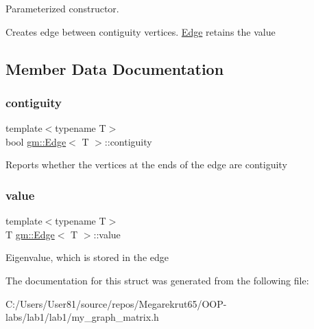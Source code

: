 Parameterized constructor. 

Creates edge between contiguity vertices. \mbox{\hyperlink{structgm_1_1_edge}{Edge}} retains the value 

\subsection{Member Data Documentation}
\mbox{\label{structgm_1_1_edge_ad9bbe3016236ffff899a0b982e96a6cd}} 
\subsubsection{\texorpdfstring{contiguity}{contiguity}}
{\footnotesize\ttfamily template$<$typename T$>$ \\
bool \mbox{\hyperlink{structgm_1_1_edge}{gm\+::\+Edge}}$<$ T $>$\+::contiguity}

Reports whether the vertices at the ends of the edge are contiguity \mbox{\label{structgm_1_1_edge_a45d07f827a6133ea2179fdbebe0867f1}} 
\subsubsection{\texorpdfstring{value}{value}}
{\footnotesize\ttfamily template$<$typename T$>$ \\
T \mbox{\hyperlink{structgm_1_1_edge}{gm\+::\+Edge}}$<$ T $>$\+::value}

Eigenvalue, which is stored in the edge 

The documentation for this struct was generated from the following file\+:\begin{DoxyCompactItemize}
\item 
C\+:/\+Users/\+User81/source/repos/\+Megarekrut65/\+O\+O\+P-\/labs/lab1/lab1/my\+\_\+graph\+\_\+matrix.\+h\end{DoxyCompactItemize}
